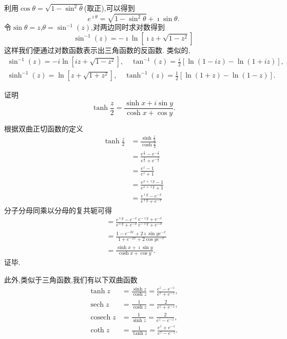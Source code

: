 利用$\cos \theta = \sqrt{1 - \sin ^2 \theta }$(取正),可以得到
\begin{equation}
  e^{\imath \theta} = \sqrt{ 1 - \sin ^2 \theta } + \imath \sin \theta .  
\end{equation} 
令$\sin \theta = z$,$\theta = \sin^{-1} (z)$,对两边同时求对数得到
\begin{equation}
    \sin^{-1} (z) = -\imath \ln \left[ \imath z + \sqrt{1-z^2} \right]
\end{equation}
这样我们便通过对数函数表示出三角函数的反函数.
类似的,
\begin{equation}
    \begin{array}{cc}
    \sin ^{-1}(z)=-i \ln \left[i z+\sqrt{1-z^2}\right], \quad \tan ^{-1}(z)=\frac{i}{2}[\ln (1-i z)-\ln (1+i z)], \\
    \sinh ^{-1}(z)=\ln \left[z+\sqrt{1+z^2}\right], \quad \tanh ^{-1}(z)=\frac{1}{2}[\ln (1+z)-\ln (1-z)] .
    \end{array}
\end{equation}

\begin{example}
    证明
    \[
        \tanh \frac{z}{2}=\frac{\sinh x+i \sin y}{\cosh x+\cos y} .  
    \]
\end{example}
\begin{solution}
根据双曲正切函数的定义
\begin{align*}
    \tanh \frac{z}{2} &= \frac{\sinh \frac{z}{2} }{ \cosh \frac{z}{2}}
    \\
    &= \frac{e^{\frac{z}{2}} - e^{-\frac{z}{2}}}{e^{\frac{z}{2}} + e^{-\frac{z}{2}}}
    \\
    &= \frac{e^{z} - 1}{e^{z} + 1} 
    \\
    &= \frac{e^{x+\imath y } -1 } { e^{x + \imath y } + 1}
    \\
    &=\frac{e^{\imath y } -e^{-x} } { e^{\imath y } + e^{-x}}
\end{align*}   
分子分母同乘以分母的复共轭可得
\begin{align*}
    &=\frac{e^{\imath y } -e^{-x} } { e^{\imath y } + e^{-x}} \frac{e^{-\imath y } + e^{-x}} { e^{-\imath y } + e^{-x}}
    \\
    &=\frac{ 1 - e^{-2x} + 2 \imath \sin y e^{-x}}{1+ e^{-2x} + 2 \cos y e^{-x} }
    \\
    &= \frac{\sinh x + \imath \sin y} {\cosh x + \cos y} .  
\end{align*}
证毕.
\end{solution}

此外,类似于三角函数,我们有以下双曲函数
\begin{equation}
    \begin{aligned}
    \tanh z & =\frac{\sinh z}{\cosh z}=\frac{e^z-e^{-z}}{e^z+e^{-z}}, \\
    \operatorname{sech} z & =\frac{1}{\cosh z}=\frac{2}{e^z+e^{-z}}, \\
    \operatorname{cosech} z & =\frac{1}{\sinh z}=\frac{2}{e^z-e^{-z}}, \\
    \coth z & =\frac{1}{\tanh z}=\frac{e^z+e^{-z}}{e^z-e^{-z}} . 
    \end{aligned}
\end{equation}


